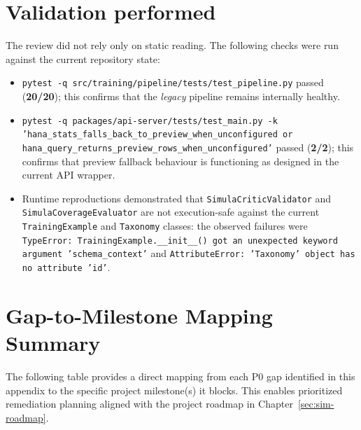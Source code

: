 \documentclass[12pt,a4paper,twoside]{report}
\begin{document}
\section{Validation performed}
The review did not rely only on static reading. The following checks
were run against the current repository state:
\begin{itemize}
\item \texttt{pytest -q src/training/pipeline/tests/test\_pipeline.py}
passed (\textbf{20/20}); this confirms that the \emph{legacy}
pipeline remains internally healthy.
\item \texttt{pytest -q packages/api-server/tests/test\_main.py -k
'hana\_stats\_falls\_back\_to\_preview\_when\_unconfigured or
hana\_query\_returns\_preview\_rows\_when\_unconfigured'} passed
(\textbf{2/2}); this confirms that preview fallback behaviour is
functioning as designed in the current API wrapper.
\item Runtime reproductions demonstrated that
\texttt{SimulaCriticValidator} and
\texttt{SimulaCoverageEvaluator} are not execution-safe against
the current \texttt{TrainingExample} and \texttt{Taxonomy}
classes: the observed failures were
\texttt{TypeError: TrainingExample.\_\_init\_\_() got an
unexpected keyword argument 'schema\_context'} and
\texttt{AttributeError: 'Taxonomy' object has no attribute 'id'}.
\end{itemize}

\section{Gap-to-Milestone Mapping Summary}

The following table provides a direct mapping from each P0 gap identified in this appendix to the specific project milestone(s) it blocks. This enables prioritized remediation planning aligned with the project roadmap in Chapter~\ref{sec:sim-roadmap}.
\end{document}

